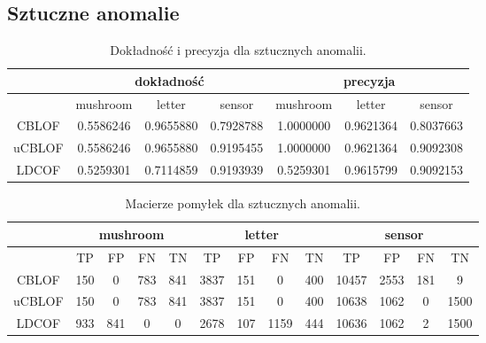 \documentclass[11pt,a4paper,twoside]{article}
\begin{document}

\subsection{Sztuczne anomalie}




\begin{table}[ht]
\centering
\caption{Dokładność i precyzja dla sztucznych anomalii.}
\label{accPrec_sztuczne}
\begin{tabular}{|*{7}{c|}}
\hline
 & \multicolumn{3}{c|}{dokładność} & \multicolumn{3}{c|}{precyzja} \\\hline
 & mushroom & letter & sensor & mushroom & letter & sensor \\\hline
 CBLOF &     0.5586246    &     0.9655880   &    0.7928788   &  1.0000000  &   0.9621364  &    0.8037663   \\\hline
 uCBLOF & 0.5586246   &      0.9655880    &   0.9195455   &   1.0000000  &   0.9621364   &  0.9092308   \\\hline
 LDCOF &    0.5259301    &      0.7114859    &   0.9193939   &  0.5259301  &   0.9615799   &   0.9092153   \\\hline
\end{tabular}
\end{table}


\begin{table}[ht]
\centering
\caption{Macierze pomyłek dla sztucznych anomalii.}
\label{confMatrix_sztuczne}
\begin{tabular}{|*{13}{c|}}
\hline
 & \multicolumn{4}{c|}{mushroom} & \multicolumn{4}{c|}{letter} & \multicolumn{4}{c|}{sensor} \\\hline
 & TP & FP & FN & TN  & TP & FP & FN & TN  & TP & FP & FN & TN \\\hline
 CBLOF &    150   &   0        &    783    &        841          &   3837   &   151     &  0      &  400  &   10457    &  2553     &   181  &  9  \\\hline
 uCBLOF &  150    &   0        &   783    &       841         &   3837   &   151     &  0       & 400  &   10638  &   1062    &   0   &  1500 \\\hline
 LDCOF &    933   &    841    &    0      &        0           &   2678   &   107     &  1159  & 444  &   10636   &  1062 &   2       &   1500      \\\hline
\end{tabular}
\end{table}
\end{document}
